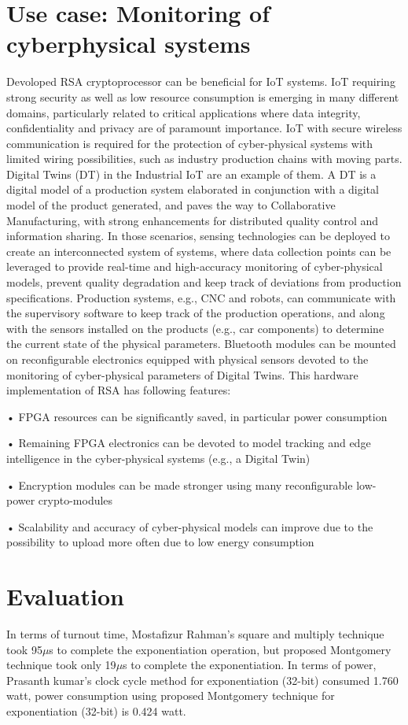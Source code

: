 \documentclass{cpp}
\begin{document}
\section{Use case: Monitoring of cyberphysical systems}
Devoloped RSA cryptoprocessor can be beneficial for IoT systems.
IoT requiring strong security as well as low resource consumption
is emerging in many different domains, particularly
related to critical applications where data integrity, confidentiality
and privacy are of paramount importance. IoT with
secure wireless communication is required for the protection
of cyber-physical systems with limited wiring possibilities,
such as industry production chains with moving parts. Digital
Twins (DT) in the Industrial IoT are an example of them. A
DT is a digital model of a production system elaborated in
conjunction with a digital model of the product generated, and
paves the way to Collaborative Manufacturing, with strong
enhancements for distributed quality control and information
sharing. In those scenarios, sensing technologies can be deployed
to create an interconnected system of systems, where
data collection points can be leveraged to provide real-time
and high-accuracy monitoring of cyber-physical models, prevent
quality degradation and keep track of deviations from
production specifications. Production systems, e.g., CNC and
robots, can communicate with the supervisory software to
keep track of the production operations, and along with the
sensors installed on the products (e.g., car components) to
determine the current state of the physical parameters. Bluetooth
modules can be mounted on reconfigurable electronics
equipped with physical sensors devoted to the monitoring of
cyber-physical parameters of Digital Twins. This hardware implementation of RSA has following features:

• FPGA resources can be significantly saved, in particular
power consumption

• Remaining FPGA electronics can be devoted to model
tracking and edge intelligence in the cyber-physical
systems (e.g., a Digital Twin)

• Encryption modules can be made stronger using many
reconfigurable low-power crypto-modules

• Scalability and accuracy of cyber-physical models can
improve due to the possibility to upload more often due
to low energy consumption

\section{Evaluation}
In terms of turnout time, Mostafizur Rahman’s square and
multiply technique \cite{rahman:rokon} took 95$\mu$s to complete the exponentiation
operation, but proposed Montgomery technique took only
19$\mu$s to complete the exponentiation. In terms of power,
Prasanth kumar’s clock cycle method \cite{kumar:kumar:parthibane} for exponentiation
(32-bit) consumed 1.760 watt, power consumption using proposed
Montgomery technique for exponentiation (32-bit) is 0.424
watt.
\end{document}
